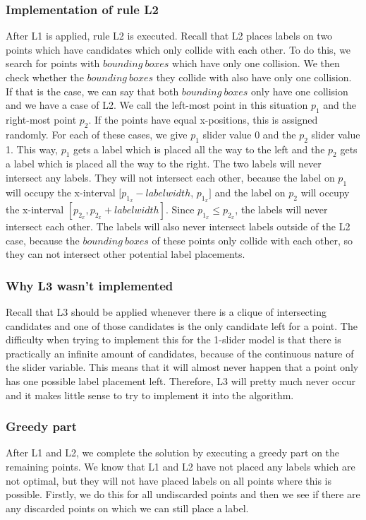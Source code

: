 \documentclass[crop=false,a4paper,oneside,11pt]{article}
\begin{document}
\subsubsection{Implementation of rule L2}
After L1 is applied, rule L2 is executed. Recall that L2 places labels on two points which have candidates which only collide with each other. To do this, we search for points with $bounding \ boxes$ which have only one collision. We then check whether the $bounding \ boxes$ they collide with also have only one collision. If that is the case, we can say that both $bounding \ boxes$ only have one collision and we have a case of L2. We call the left-most point in this situation $p_1$ and the right-most point $p_2$. If the points have equal x-positions, this is assigned randomly. For each of these cases, we give $p_1$ slider value 0 and the $p_2$ slider value 1. This way, $p_1$ gets a label which is placed all the way to the left and the $p_2$ gets a label which is placed all the way to the right. The two labels will never intersect any labels. They will not intersect each other, because the label on $p_1$ will occupy the x-interval $[p_{1_x} - labelwidth$, $p_{1_x}]$ and the label on $p_2$ will occupy the x-interval $[p_{2_x}, p_{2_x} + labelwidth]$. Since $p_{1_x} \leq p_{2_x}$, the labels will never intersect each other. The labels will also never intersect labels outside of the L2 case, because the $bounding \ boxes$ of these points only collide with each other, so they can not intersect other potential label placements.

\subsubsection{Why L3 wasn't implemented}
Recall that L3 should be applied whenever there is a clique of intersecting candidates and one of those candidates is the only candidate left for a point. The difficulty when trying to implement this for the 1-slider model is that there is practically an infinite amount of candidates, because of the continuous nature of the slider variable. This means that it will almost never happen that a point only has one possible label placement left. Therefore, L3 will pretty much never occur and it makes little sense to try to implement it into the algorithm.

\subsubsection{Greedy part}
After L1 and L2, we complete the solution by executing a greedy part on the remaining points. We know that L1 and L2 have not placed any labels which are not optimal, but they will not have placed labels on all points where this is possible. Firstly, we do this for all undiscarded points and then we see if there are any discarded points on which we can still place a label.
\end{document}
